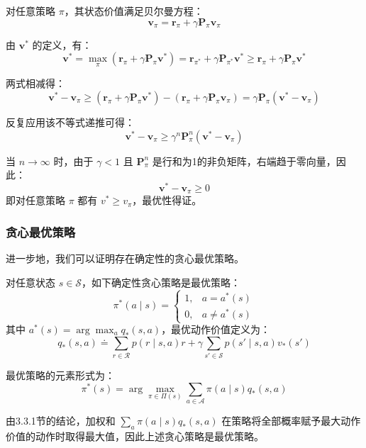 \documentclass[UTF8]{article}
\begin{document}
\begin{proofbox}
    对任意策略 $\pi$，其状态价值满足贝尔曼方程：
    \[
    \boldsymbol{v}_\pi = \boldsymbol{r}_\pi + \gamma \boldsymbol{P}_\pi \boldsymbol{v}_\pi
    \]

    由 $\boldsymbol{v}^*$ 的定义，有：
    \[
    \boldsymbol{v}^* = \max_\pi (\boldsymbol{r}_\pi + \gamma \boldsymbol{P}_\pi \boldsymbol{v}^*) = \boldsymbol{r}_{\pi^*} + \gamma \boldsymbol{P}_{\pi^*} \boldsymbol{v}^* \geq \boldsymbol{r}_\pi + \gamma \boldsymbol{P}_\pi \boldsymbol{v}^*
    \]

    两式相减得：
    \[
    \boldsymbol{v}^* - \boldsymbol{v}_\pi \geq (\boldsymbol{r}_\pi + \gamma \boldsymbol{P}_\pi \boldsymbol{v}^*) - (\boldsymbol{r}_\pi + \gamma \boldsymbol{P}_\pi \boldsymbol{v}_\pi) = \gamma \boldsymbol{P}_\pi (\boldsymbol{v}^* - \boldsymbol{v}_\pi)
    \]

    反复应用该不等式递推可得：
    \[
    \boldsymbol{v}^* - \boldsymbol{v}_\pi \geq \gamma^n \boldsymbol{P}_\pi^n (\boldsymbol{v}^* - \boldsymbol{v}_\pi)
    \]

    当 $n \to \infty$ 时，由于 $\gamma < 1$ 且 $\boldsymbol{P}_\pi^n$ 是行和为1的非负矩阵，右端趋于零向量，因此：
    \[
    \boldsymbol{v}^* - \boldsymbol{v}_\pi \geq 0
    \]
    即对任意策略 $\pi$ 都有 $v^* \geq v_\pi$，最优性得证。
\end{proofbox}

\subsubsection*{贪心最优策略}

进一步地，我们可以证明存在确定性的贪心最优策略。

\begin{theorembox}[3.5 贪心最优策略]
    对任意状态 $s \in \mathcal{S}$，如下确定性贪心策略是最优策略：
    \begin{equation}
    \pi^*(a \mid s) =
    \begin{cases}
    1, & a = a^*(s) \\
    0, & a \neq a^*(s)
    \end{cases}
    \end{equation}
    其中 $a^*(s) = \arg\max_a q_*(s, a)$，最优动作价值定义为：
    \[
    q_*(s, a) \doteq \sum_{r \in \mathcal{R}} p(r \mid s, a) r + \gamma \sum_{s' \in \mathcal{S}} p(s' \mid s, a) v_*(s')
    \]
\end{theorembox}

\begin{proofbox}
    最优策略的元素形式为：
    \[
    \pi^*(s) = \arg\max_{\pi \in \Pi(s)} \sum_{a \in \mathcal{A}} \pi(a \mid s) q_*(s, a)
    \]

    由3.3.1节的结论，加权和 $\sum_a \pi(a \mid s) q_*(s, a)$ 在策略将全部概率赋予最大动作价值的动作时取得最大值，因此上述贪心策略是最优策略。
\end{proofbox}
\end{document}
